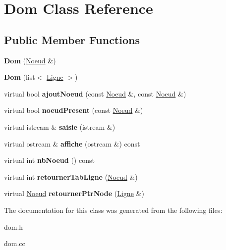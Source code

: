 \hypertarget{class_dom}{\section{Dom Class Reference}
\label{class_dom}
}
\subsection*{Public Member Functions}
\begin{DoxyCompactItemize}
\item 
\hypertarget{class_dom_a3760e9581e6764d429fc68d070546f3f}{{\bfseries Dom} (\hyperlink{class_noeud}{Noeud} \&)}\label{class_dom_a3760e9581e6764d429fc68d070546f3f}

\item 
\hypertarget{class_dom_ae02da1237c5c884af49ea992417cfdcd}{{\bfseries Dom} (list$<$ \hyperlink{class_ligne}{Ligne} $>$)}\label{class_dom_ae02da1237c5c884af49ea992417cfdcd}

\item 
\hypertarget{class_dom_ae640a720c988454576287a5b6c083a6a}{virtual bool {\bfseries ajout\-Noeud} (const \hyperlink{class_noeud}{Noeud} \&, const \hyperlink{class_noeud}{Noeud} \&)}\label{class_dom_ae640a720c988454576287a5b6c083a6a}

\item 
\hypertarget{class_dom_ab700f17d298e9d403d1189e6cbd2e21e}{virtual bool {\bfseries noeud\-Present} (const \hyperlink{class_noeud}{Noeud} \&)}\label{class_dom_ab700f17d298e9d403d1189e6cbd2e21e}

\item 
\hypertarget{class_dom_abae2486b2f93b2c45e3ff830219488b2}{virtual istream \& {\bfseries saisie} (istream \&)}\label{class_dom_abae2486b2f93b2c45e3ff830219488b2}

\item 
\hypertarget{class_dom_a692547ba6010fd70040e8b4ab2805349}{virtual ostream \& {\bfseries affiche} (ostream \&) const }\label{class_dom_a692547ba6010fd70040e8b4ab2805349}

\item 
\hypertarget{class_dom_ab7755b82fa26674d7d31833a0a38887b}{virtual int {\bfseries nb\-Noeud} () const }\label{class_dom_ab7755b82fa26674d7d31833a0a38887b}

\item 
\hypertarget{class_dom_a50701606026b355374e210ca659d9738}{virtual int {\bfseries retourner\-Tab\-Ligne} (\hyperlink{class_noeud}{Noeud} \&)}\label{class_dom_a50701606026b355374e210ca659d9738}

\item 
\hypertarget{class_dom_a227c734caf6f1d36a7cf5b21306b240b}{virtual \hyperlink{class_noeud}{Noeud} {\bfseries retourner\-Ptr\-Node} (\hyperlink{class_ligne}{Ligne} \&)}\label{class_dom_a227c734caf6f1d36a7cf5b21306b240b}

\end{DoxyCompactItemize}


The documentation for this class was generated from the following files\-:\begin{DoxyCompactItemize}
\item 
dom.\-h\item 
dom.\-cc\end{DoxyCompactItemize}
